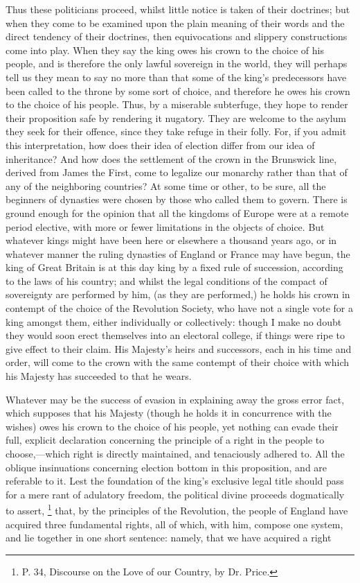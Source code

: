 Thus these politicians proceed, whilst little notice is taken of their doctrines; but when they come to be examined upon the plain meaning of their words and the direct tendency of their doctrines, then equivocations and slippery constructions come into play. When they say the king owes his crown to the choice of his people, and is therefore the only lawful sovereign in the world, they will perhaps tell us they mean to say no more than that some of the king's predecessors have been called to the throne by some sort of choice, and therefore he owes his crown to the choice of his people. Thus, by a miserable subterfuge, they hope to render their proposition safe by rendering it nugatory. They are welcome to the asylum they seek for their offence, since they take refuge in their folly. For, if you admit this interpretation, how does their idea of election differ from our idea of inheritance? And how does the settlement of the crown in the Brunswick line, derived from James the First, come to legalize our monarchy rather than that of any of the neighboring countries? At some time or other, to be sure, all the beginners of dynasties were chosen by those who called them to govern. There is ground enough for the opinion that all the kingdoms of Europe were at a remote period elective, with more or fewer limitations in the objects of choice. But whatever kings might have been here or elsewhere a thousand years ago, or in whatever manner the ruling dynasties of England or France may have begun, the king of Great Britain is at this day king by a fixed rule of succession, according to the laws of his country; and whilst the legal conditions of the compact of sovereignty are performed by him, (as they are performed,) he holds his crown in contempt of the choice of the Revolution Society, who have not a single vote for a king amongst them, either individually or collectively: though I make no doubt they would soon erect themselves into an electoral college, if things were ripe to give effect to their claim. His Majesty's heirs and successors, each in his time and order, will come to the crown with the same contempt of their choice with which his Majesty has succeeded to that he wears.

Whatever may be the success of evasion in explaining away the gross error fact, which supposes that his Majesty (though he holds it in concurrence with the wishes) owes his crown to the choice of his people, yet nothing can evade their full, explicit declaration concerning the principle of a right in the people to choose,—which right is directly maintained, and tenaciously adhered to. All the oblique insinuations concerning election bottom in this proposition, and are referable to it. Lest the foundation of the king's exclusive legal title should pass for a mere rant of adulatory freedom, the political divine proceeds dogmatically to assert,
\footnote{ P. 34, Discourse on the Love of our Country, by Dr. Price.}
 that, by the principles of the Revolution, the people of England have acquired three fundamental rights, all of which, with him, compose one system, and lie together in one short sentence: namely, that we have acquired a right

